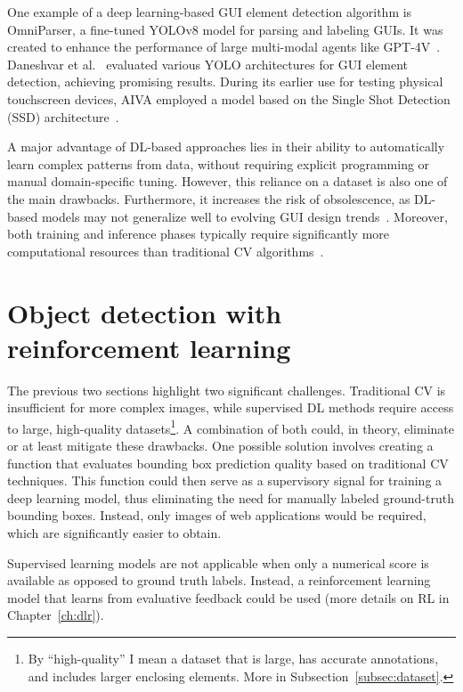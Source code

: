 \documentclass[
  digital,     %
  oneside,     %
  nosansbold,  %
  nocolorbold, %
  lof,         %
  lot,         %
]{fithesis4}
\begin{document}
One example of a deep learning-based GUI element detection algorithm is OmniParser, a fine-tuned YOLOv8 model for parsing and labeling GUIs. It was created to enhance the performance of large multi-modal agents like GPT-4V~\cite{OmniParser}. Daneshvar et al.~\cite{GUI_YOLO_comparison} evaluated various YOLO architectures for GUI element detection, achieving promising results. During its earlier use for testing physical touchscreen devices, AIVA employed a model based on the Single Shot Detection (SSD) architecture~\cite{Horak2020thesis}.

A major advantage of DL-based approaches lies in their ability to automatically learn complex patterns from data, without requiring explicit programming or manual domain-specific tuning. However, this reliance on a dataset is also one of the main drawbacks. Furthermore, it increases the risk of obsolescence, as DL-based models may not generalize well to evolving GUI design trends~\cite{DLvsTCV}. Moreover, both training and inference phases typically require significantly more computational resources than traditional CV algorithms~\cite{DLvsTCV}.

\section{Object detection with reinforcement learning}

The previous two sections highlight two significant challenges. Traditional CV is insufficient for more complex images, while supervised DL methods require access to large, high-quality datasets\footnote{By \enquote{high-quality} I mean a dataset that is large, has accurate annotations, and includes larger enclosing elements. More in Subsection~\ref{subsec:dataset}.}. A combination of both could, in theory, eliminate or at least mitigate these drawbacks. One possible solution involves creating a function that evaluates bounding box prediction quality based on traditional CV techniques. This function could then serve as a supervisory signal for training a deep learning model, thus eliminating the need for manually labeled ground-truth bounding boxes. Instead, only images of web applications would be required, which are significantly easier to obtain.

Supervised learning models are not applicable when only a numerical score is available as opposed to ground truth labels. Instead, a reinforcement learning model that learns from evaluative feedback could be used (more details on RL in Chapter~\ref{ch:dlr}).
\end{document}
